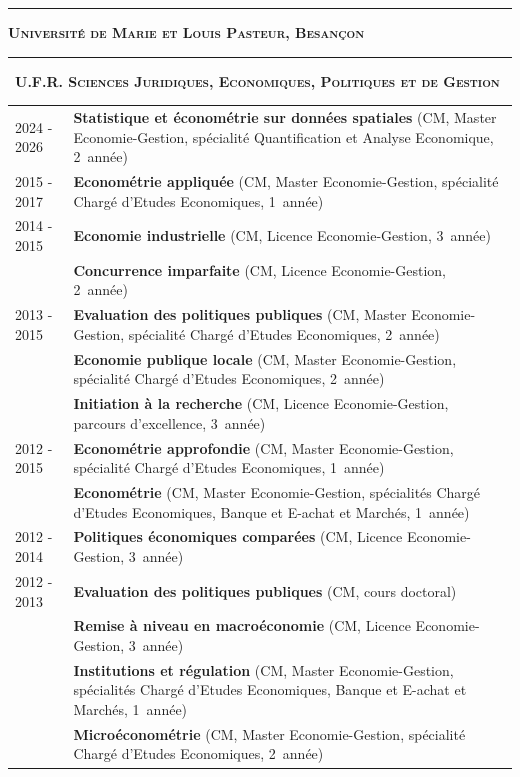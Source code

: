 \documentclass[a4paper,12pt]{article}
\newcommand{\titre}[1]{%
	\bigskip
	\noindent \rule[2mm]{\textwidth}{0.5pt}
	\textbf{\textsc{\large #1}} \\
	\noindent \rule[1mm]{\textwidth}{0.5pt}
	}
\newcommand{\smalltitre}[1]{%
	\noindent \textbullet~\textsc{\textbf{#1}}
	\smallskip
	}
\begin{document}
\newpage

\titre{Université de Marie et Louis Pasteur, Besançon}

\smalltitre{U.F.R. Sciences Juridiques, Economiques, Politiques et de Gestion}

\noindent \begin{longtable}{@{}p{\annee}p{\texte}@{}}
2024 - 2026	& \textbf{Statistique et économétrie sur données spatiales} (CM, Master Economie-Gestion, spécialité Quantification et Analyse Economique, 2\ieme{}~année) \\
2015 - 2017	& \textbf{Econométrie appliquée} (CM, Master Economie-Gestion, spécialité Chargé d'Etudes Economiques, 1\iere{}~année) \\
2014 - 2015	& \textbf{Economie industrielle} (CM, Licence Economie-Gestion, 3\ieme{}~année) \\
			& \textbf{Concurrence imparfaite} (CM, Licence Economie-Gestion, 2\ieme{}~année) \\
2013 - 2015	& \textbf{Evaluation des politiques publiques} (CM, Master Economie-Gestion, spécialité Chargé d'Etudes Economiques, 2\ieme{}~année) \\
			& \textbf{Economie publique locale} (CM, Master Economie-Gestion, spécialité Chargé d'Etudes Economiques, 2\ieme{}~année) \\
			& \textbf{Initiation à la recherche} (CM, Licence Economie-Gestion, parcours d'excellence, 3\ieme{}~année) \\
2012 - 2015	& \textbf{Econométrie approfondie} (CM, Master Economie-Gestion, spécialité Chargé d'Etudes Economiques, 1\iere{}~année) \\
			& \textbf{Econométrie} (CM, Master Economie-Gestion, spécialités Chargé d'Etudes Economiques, Banque et E-achat et Marchés, 1\iere{}~année) \\
2012 - 2014	& \textbf{Politiques économiques comparées} (CM, Licence Economie-Gestion, 3\ieme{}~année) \\
2012 - 2013	& \textbf{Evaluation des politiques publiques} (CM, cours doctoral) \\
			& \textbf{Remise à niveau en macroéconomie} (CM, Licence Economie-Gestion, 3\ieme{}~année) \\
			& \textbf{Institutions et régulation} (CM, Master Economie-Gestion, spécialités Chargé d'Etudes Economiques, Banque et E-achat et Marchés, 1\iere{}~année) \\
			& \textbf{Microéconométrie} (CM, Master Economie-Gestion, spécialité Chargé d'Etudes Economiques, 2\ieme{}~année) \\

\end{longtable}
\end{document}
